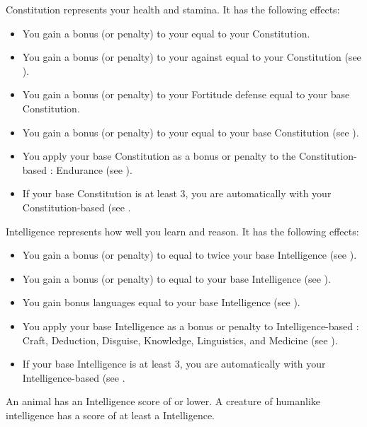         \label{Constitution}
        {
            Constitution represents your health and stamina.
            It has the following effects:
            \begin{itemize}
                \item You gain a bonus (or penalty) to your  equal to your Constitution.
                \item You gain a bonus (or penalty) to your  against  equal to your Constitution (see ).
                \item You gain a bonus (or penalty) to your Fortitude defense equal to your base Constitution.
                \item You gain a bonus (or penalty) to your  equal to your base Constitution (see ).
                \item You apply your base Constitution as a bonus or penalty to the Constitution-based : Endurance (see ).
                \item If your base Constitution is at least 3, you are automatically  with your Constitution-based  (see .
            \end{itemize}
        }

        \label{Intelligence}
        {
            Intelligence represents how well you learn and reason.
            It has the following effects:

            \begin{itemize}
                \item You gain a bonus (or penalty) to  equal to twice your base Intelligence (see ).
                \item You gain a bonus (or penalty) to  equal to your base Intelligence (see ).
                \item You gain bonus languages equal to your base Intelligence (see ).
                \item You apply your base Intelligence as a bonus or penalty to Intelligence-based : Craft, Deduction, Disguise, Knowledge, Linguistics, and Medicine (see ).
                \item If your base Intelligence is at least 3, you are automatically  with your Intelligence-based  (see .
            \end{itemize}

            \par An animal has an Intelligence score of  or lower.
            A creature of humanlike intelligence has a score of at least a  Intelligence.
        }

